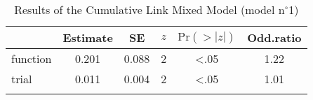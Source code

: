 \begin{table}
\begin{tabular}{l S[table-format=1.3] S[table-format=1.3] S[table-format=1] S[table-format=<1.2] S[table-format=1.2]}
  \lsptoprule
 & {Estimate} & {SE} & {$z$} & {$\text{Pr}(>|z|)$} & {Odd.ratio} \\ 
  \midrule
  function & 0.201 & 0.088 & 2 & <.05 & 1.22 \\ 
  trial & 0.011 & 0.004 & 2 & <.05 & 1.01 \\ 
 \lspbottomrule
\end{tabular}
\caption{Results of the Cumulative Link Mixed Model (model n$^{\circ}$1)}
\label{tab:exp05-m1}
\end{table}
